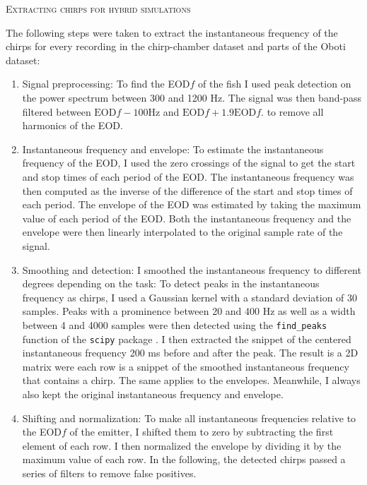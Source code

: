 \newpage

\begin{center}
  \textsc{Extracting chirps for hybrid simulations}
\end{center}

The following steps were taken to extract the instantaneous frequency of the
chirps for every recording in the chirp-chamber dataset and parts of the Oboti
dataset:

\begin{enumerate}

  \item Signal preprocessing: To find the EOD$f$ of the fish I used peak
    detection on the power spectrum between 300 and 1200 \si{\hertz}. The
    signal was then band-pass filtered between $\text{EOD}f - 100\si{\hertz}$
    and $\text{EOD}f + 1.9\text{EOD}f$. to remove all harmonics of the EOD.

  \item Instantaneous frequency and envelope: To estimate the instantaneous
    frequency of the EOD, I used the zero crossings of the signal to get the
    start and stop times of each period of the EOD. The instantaneous frequency
    was then computed as the inverse of the difference of the start and stop
    times of each period. The envelope of the EOD was estimated by taking the
    maximum value of each period of the EOD. Both the instantaneous frequency
    and the envelope were then linearly interpolated to the original sample
    rate of the signal.

  \item Smoothing and detection: I smoothed the instantaneous frequency to
    different degrees depending on the task: To detect peaks in the
    instantaneous frequency as chirps, I used a Gaussian kernel with a standard
    deviation of 30 samples. Peaks with a prominence between 20 and 400
    \si{\hertz} as well as a width between 4 and 4000 samples were then
    detected using the \texttt{find\_peaks} function of the \texttt{scipy}
    package \parencite{virtanenSciPyFundamentalAlgorithms2020}. I then
    extracted the snippet of the centered instantaneous frequency 200 ms before
    and after the peak. The result is a 2D matrix were each row is a snippet of
    the smoothed instantaneous frequency that contains a chirp. The same
    applies to the envelopes. Meanwhile, I always also kept the original
    instantaneous frequency and envelope.

  \item Shifting and normalization: To make all instantaneous frequencies
    relative to the EOD$f$ of the emitter, I shifted them to zero by
    subtracting the first element of each row. I then normalized the
    envelope by dividing it by the maximum value of each row. In the following,
    the detected chirps passed a series of filters to remove false positives.


\end{enumerate}
